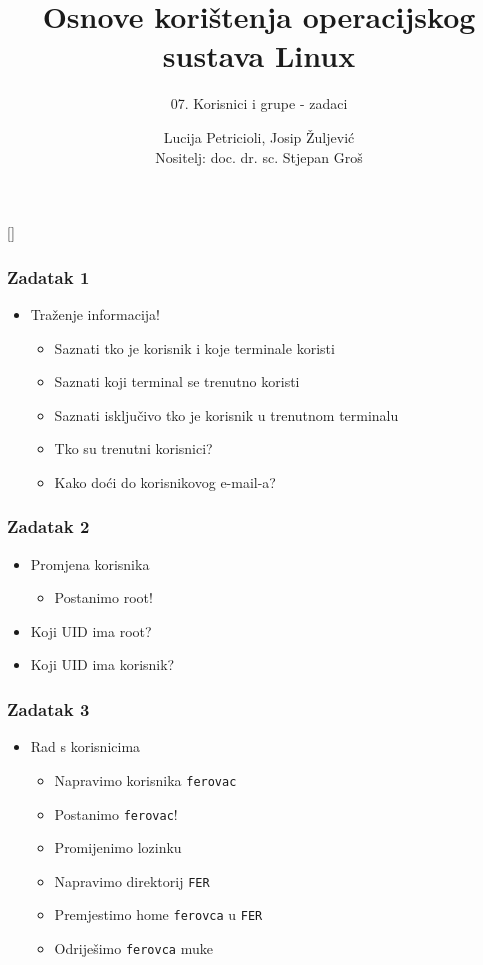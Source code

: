 \documentclass[table,usenames,dvipsnames] {beamer}
\title{Osnove korištenja operacijskog sustava Linux}
\subtitle{07. Korisnici i grupe - zadaci}
\author[Lucija Petricioli, Josip Žuljević]{Lucija Petricioli, Josip Žuljević\\{\small Nositelj: doc. dr. sc. Stjepan Groš}}
\institute[FER]{Sveučilište u Zagrebu \\
				Fakultet elektrotehnike i računarstva}
\date{\todayiso}
\newcommand{\shell}[1]{\texttt{#1}}
\begin{document}
{
[] %

\begin{frame}
\maketitle
\end{frame}
}

\begin{frame}[t]
\frametitle{Zadatak 1}
\begin{itemize}
  \item Traženje informacija!
  \begin{itemize}
    \item Saznati tko je korisnik i koje terminale koristi
    \item Saznati koji terminal se trenutno koristi
    \item Saznati isključivo tko je korisnik u trenutnom terminalu
    \item Tko su trenutni korisnici?
	\item Kako doći do korisnikovog e-mail-a? 
  \end{itemize}
\end{itemize}
\end{frame}

\begin{frame}[t]
\frametitle{Zadatak 2}
\begin{itemize}
  \item Promjena korisnika
  \begin{itemize}
    \item Postanimo root!
  \end{itemize}
  \item Koji UID ima root?
  \item Koji UID ima korisnik? 
\end{itemize}
\end{frame}

\begin{frame}[t]
\frametitle{Zadatak 3}
\begin{itemize}
  \item Rad s korisnicima
  \begin{itemize}
    \item Napravimo korisnika \shell{ferovac}
    \item Postanimo \shell{ferovac}!
    \item Promijenimo lozinku
    \item Napravimo direktorij \shell{FER}
    \item Premjestimo home \shell{ferovca} u \shell{FER}
    \item Odriješimo \shell{ferovca} muke
  \end{itemize}
\end{itemize}
\end{frame}
\end{document}
